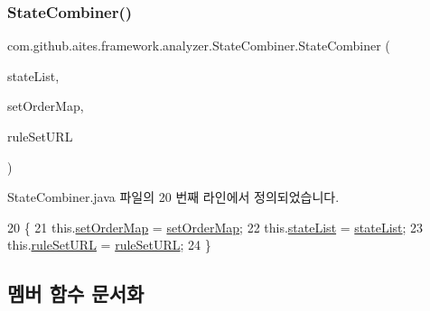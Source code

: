 \subsubsection{\texorpdfstring{State\+Combiner()}{StateCombiner()}}
{\footnotesize\ttfamily com.\+github.\+aites.\+framework.\+analyzer.\+State\+Combiner.\+State\+Combiner (\begin{DoxyParamCaption}\item[{Array\+List$<$ String $>$}]{state\+List,  }\item[{Hash\+Map$<$ Integer, String $>$}]{set\+Order\+Map,  }\item[{String}]{rule\+Set\+U\+RL }\end{DoxyParamCaption})}



State\+Combiner.\+java 파일의 20 번째 라인에서 정의되었습니다.


\begin{DoxyCode}
20                                                                                                            
         \{
21         this.\mbox{\hyperlink{classcom_1_1github_1_1aites_1_1framework_1_1analyzer_1_1_state_combiner_abcc50de313d376043ae0b3680e2df001}{setOrderMap}} = \mbox{\hyperlink{classcom_1_1github_1_1aites_1_1framework_1_1analyzer_1_1_state_combiner_abcc50de313d376043ae0b3680e2df001}{setOrderMap}};
22         this.\mbox{\hyperlink{classcom_1_1github_1_1aites_1_1framework_1_1analyzer_1_1_state_combiner_a1997e445fc92d5f97741d28ff6010299}{stateList}} = \mbox{\hyperlink{classcom_1_1github_1_1aites_1_1framework_1_1analyzer_1_1_state_combiner_a1997e445fc92d5f97741d28ff6010299}{stateList}};
23         this.\mbox{\hyperlink{classcom_1_1github_1_1aites_1_1framework_1_1analyzer_1_1_state_combiner_a28a5b0f5141f7dc072500524894d7041}{ruleSetURL}} = \mbox{\hyperlink{classcom_1_1github_1_1aites_1_1framework_1_1analyzer_1_1_state_combiner_a28a5b0f5141f7dc072500524894d7041}{ruleSetURL}};
24     \}
\end{DoxyCode}


\subsection{멤버 함수 문서화}
\mbox{\label{classcom_1_1github_1_1aites_1_1framework_1_1analyzer_1_1_state_combiner_a00b6be9a8c91af80dddd1d93bb20d067}} 
